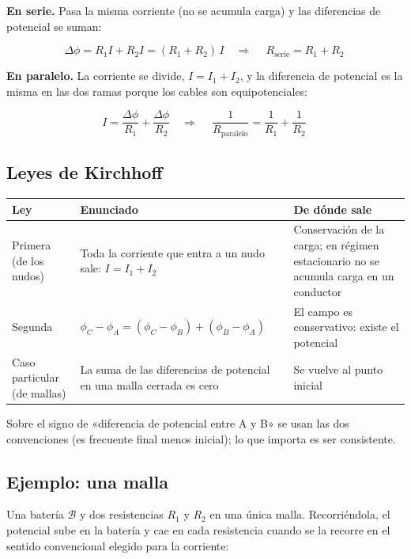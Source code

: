 \documentclass[12pt,a4paper]{article}
\begin{document}
\textbf{En serie.} Pasa la misma corriente (no se acumula carga) y las diferencias de
potencial se suman:

\[
\Delta\phi = R_1 I + R_2 I = (R_1+R_2)\,I
\quad\Longrightarrow\quad
\boxed{\ R_{\text{serie}} = R_1 + R_2\ }
\]

\textbf{En paralelo.} La corriente se divide, $I = I_1 + I_2$, y la diferencia de
potencial es la misma en las dos ramas porque los cables son equipotenciales:

\[
I = \frac{\Delta\phi}{R_1} + \frac{\Delta\phi}{R_2}
\quad\Longrightarrow\quad
\boxed{\ \frac{1}{R_{\text{paralelo}}} = \frac{1}{R_1} + \frac{1}{R_2}\ }
\]

\subsection{Leyes de Kirchhoff}

\begin{center}
\renewcommand{\arraystretch}{1.35}
\small
\begin{tabularx}{\textwidth}{>{\raggedright\arraybackslash}X>{\raggedright\arraybackslash}X>{\raggedright\arraybackslash}X}
\toprule
\textbf{Ley} & \textbf{Enunciado} & \textbf{De dónde sale} \\
\midrule
Primera (de los nudos) & Toda la corriente que entra a un nudo sale: $I = I_1 + I_2$ & Conservación de la carga; en régimen estacionario no se acumula carga en un conductor \\
Segunda & $\phi_C - \phi_A = (\phi_C - \phi_B) + (\phi_B - \phi_A)$ & El campo es conservativo: existe el potencial \\
Caso particular (de mallas) & La suma de las diferencias de potencial en una malla cerrada es cero & Se vuelve al punto inicial \\
\bottomrule
\end{tabularx}
\end{center}

Sobre el signo de «diferencia de potencial entre A y B» se usan las dos
convenciones (es frecuente final menos inicial); lo que importa es ser
consistente.

\subsection{Ejemplo: una malla}

Una batería $\mathcal{B}$ y dos resistencias $R_1$ y $R_2$ en una única malla.
Recorriéndola, el potencial sube en la batería y cae en cada resistencia cuando
se la recorre en el sentido convencional elegido para la corriente:
\end{document}
